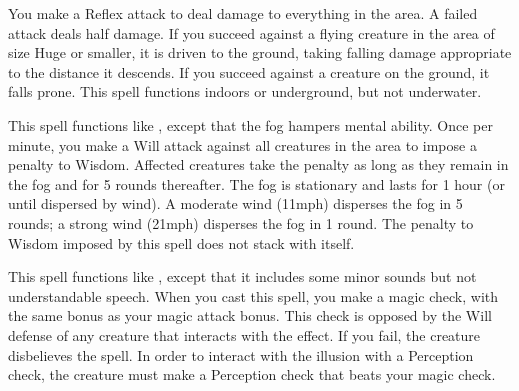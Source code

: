 \spelleffect You make a Reflex attack to deal damage to everything in the area. A failed attack deals half damage. If you succeed against a flying creature in the area of size Huge or smaller, it is driven to the ground, taking falling damage appropriate to the distance it descends. If you succeed against a creature on the ground, it falls prone.
\spellnotes This spell functions indoors or underground, but not underwater.

\spelleffect This spell functions like , except that the fog hampers mental ability. Once per minute, you make a Will attack against all creatures in the area to impose a  penalty to Wisdom. Affected creatures take the penalty as long as they remain in the fog and for 5 rounds thereafter. The fog is stationary and lasts for 1 hour (or until dispersed by wind).
\spellnotes A moderate wind (11\add mph) disperses the fog in 5 rounds; a strong wind (21\add mph) disperses the fog in 1 round. The penalty to Wisdom imposed by this spell does not stack with itself.

\spelleffect This spell functions like , except that it includes some minor sounds but not understandable speech.
\spellnotes When you cast this spell, you make a magic check, with the same bonus as your magic attack bonus. This check is opposed by the Will defense of any creature that interacts with the effect. If you fail, the creature disbelieves the spell. In order to interact with the illusion with a Perception check, the creature must make a Perception check that beats your magic check.

